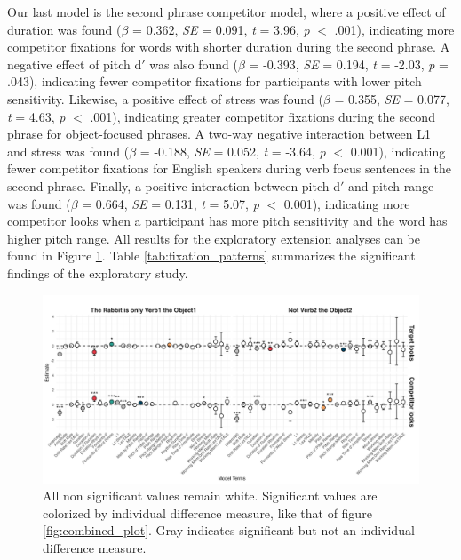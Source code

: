 Our last model is the second phrase competitor model, where a positive effect of duration was found ($\beta$ = 0.362, \textit{SE} = 0.091, \textit{t} = 3.96, \textit{p} $<$ .001), indicating more competitor fixations for words with shorter duration during the second phrase. A negative effect of pitch d$'$ was also found ($\beta$ = -0.393, \textit{SE} = 0.194, \textit{t} = -2.03, \textit{p} = .043), indicating fewer competitor fixations for participants with lower pitch sensitivity. Likewise, a positive effect of stress was found ($\beta$ = 0.355, \textit{SE} = 0.077, \textit{t} = 4.63, \textit{p} $<$ .001), indicating greater competitor fixations during the second phrase for object-focused phrases. A two-way negative interaction between L1 and stress was found ($\beta$ = -0.188, \textit{SE} = 0.052, \textit{t} = -3.64, \textit{p} $<$ 0.001), indicating fewer competitor fixations for English speakers during verb focus sentences in the second phrase. Finally, a positive interaction between pitch d$'$ and pitch range was found ($\beta$ = 0.664, \textit{SE} = 0.131, \textit{t} = 5.07, \textit{p} $<$ 0.001), indicating more competitor looks when a participant has more pitch sensitivity and the word has higher pitch range. All results for the exploratory extension analyses can be found in Figure \ref{fig:id_gam_mod_out}. Table \ref{tab:fixation_patterns} summarizes the significant findings of the exploratory study.

\begin{figure}[H]  %
    \centering
    \includegraphics[width=\textwidth,height=\textheight,keepaspectratio]{viz/id_gam_mod_out.png}
    \caption{All non significant values remain white. Significant values are colorized by individual difference measure, like that of figure \ref{fig:combined_plot}. Gray indicates significant but not an individual difference measure.}
    \label{fig:id_gam_mod_out}
\end{figure}


